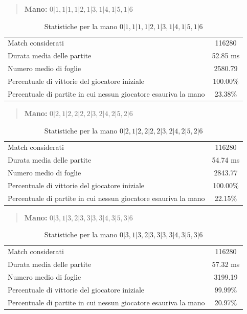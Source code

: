 \documentclass[a4paper,12pt]{report}
\begin{document}
\begin{quote}
    \textbf{Mano:} \(0|1, 1|1, 1|2, 1|3, 1|4, 1|5, 1|6\)
\end{quote}

\begin{table}[h!]
    \centering
    \begin{tabular}{|l|c|}
        \hline
        Match considerati & 116280 \\
        Durata media delle partite & 52.85 ms \\
        Numero medio di foglie &  2580.79 \\
        Percentuale di vittorie del giocatore iniziale & 100.00\% \\
        Percentuale di partite in cui nessun giocatore esauriva la mano &  23.38\% \\
        \hline
    \end{tabular}
    \caption{Statistiche per la mano \(0|1, 1|1, 1|2, 1|3, 1|4, 1|5, 1|6\)}
    \label{tab:stats_tutti_1}
\end{table}


\begin{quote}
    \textbf{Mano:} \(0|2, 1|2, 2|2, 2|3, 2|4, 2|5, 2|6\)
\end{quote}

\begin{table}[h!]
    \centering
    \begin{tabular}{|l|c|}
        \hline
        Match considerati & 116280 \\
        Durata media delle partite &  54.74 ms \\
        Numero medio di foglie &  2843.77 \\
        Percentuale di vittorie del giocatore iniziale & 100.00\% \\
        Percentuale di partite in cui nessun giocatore esauriva la mano &  22.15\% \\
        \hline
    \end{tabular}
    \caption{Statistiche per la mano \(0|2, 1|2, 2|2, 2|3, 2|4, 2|5, 2|6\)}
    \label{tab:stats_tutti_2}
\end{table}


\begin{quote}
    \textbf{Mano:} \(0|3, 1|3, 2|3, 3|3, 3|4, 3|5, 3|6\)
\end{quote}

\begin{table}[h!]
    \centering
    \begin{tabular}{|l|c|}
        \hline
        Match considerati & 116280 \\
        Durata media delle partite &  57.32 ms \\
        Numero medio di foglie &  3199.19 \\
        Percentuale di vittorie del giocatore iniziale & 99.99\% \\
        Percentuale di partite in cui nessun giocatore esauriva la mano &  20.97\% \\
        \hline
    \end{tabular}
    \caption{Statistiche per la mano \(0|3, 1|3, 2|3, 3|3, 3|4, 3|5, 3|6\)}
    \label{tab:stats_tutti_3}
\end{table}
\end{document}

